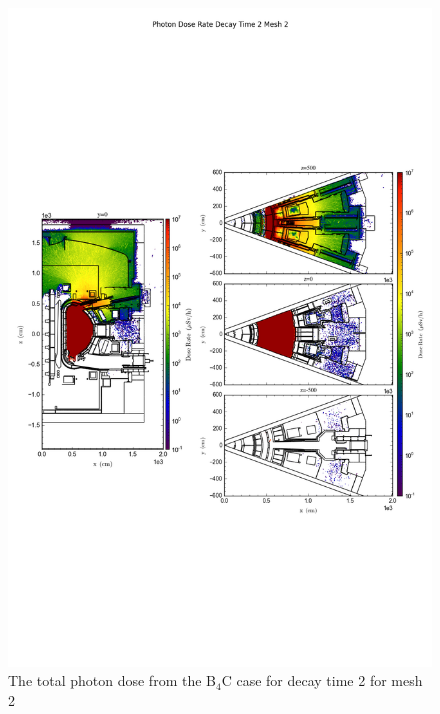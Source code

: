 \documentclass[12pt]{article}
\begin{document}
\newpage
\clearpage

\begin{figure}[ht!]
\centering
\includegraphics[trim={0cm 9cm 0cm 10cm},clip,scale=0.75]{../plots/final_model/Photon_Dose_Rate_Decay_Time_2_Mesh_2.png}
\caption{The total photon dose from the B$_4$C case for decay time 2 for mesh 2}
\label{fig:ct_photons_dc2_no4bc_m2_flux}
\end{figure}
\newpage
\clearpage
\end{document}
